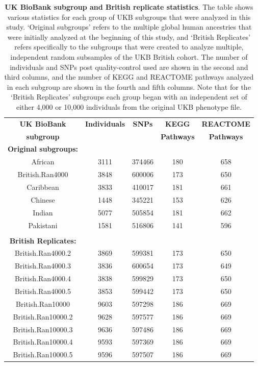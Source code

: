 \documentclass[12pt,a4paper]{article}
\begin{document}
\begin{table}[ht]
\centering
\begin{tabular}{ccccc}
  \hline
\textbf{UK BioBank} & \textbf{Individuals} & \textbf{SNPs} & \textbf{KEGG} & \textbf{REACTOME} \\
\textbf{subgroup} & & & \textbf{Pathways} & \textbf{Pathways}  \\
  \hline
\textbf{Original subgroups:} & & & & \\
African & 3111 & 374466 & 180 & 658 \\ 
British.Ran4000 & 3848 & 600006 & 173 & 650 \\ 
Caribbean & 3833 & 410017 & 181 & 661 \\ 
Chinese & 1448 & 345221 & 153 & 626 \\ 
Indian & 5077 & 505854 & 181 & 662 \\ 
Pakistani & 1581 & 516806 & 141 & 596 \\ 
\\
\textbf{British Replicates:} & & & & \\
British.Ran4000.2 & 3869 & 599381 & 173 & 650 \\ 
British.Ran4000.3 & 3836 & 600654 & 173 & 649 \\ 
British.Ran4000.4 & 3838 & 599829 & 173 & 650 \\ 
British.Ran4000.5 & 3853 & 599442 & 173 & 650 \\ 
British.Ran10000 & 9603 & 597298 & 186 & 669 \\ 
British.Ran10000.2 & 9628 & 597577 & 186 & 669 \\ 
British.Ran10000.3 & 9636 & 597486 & 186 & 669 \\ 
British.Ran10000.4 & 9593 & 597369 & 186 & 669 \\ 
British.Ran10000.5 & 9596 & 597507 & 186 & 669 \\ 
  \hline
\end{tabular}
\caption[TBD]{\textbf{UK BioBank subgroup and British replicate statistics}. The table shows various statistics for each group of UKB subgroups that were analyzed in this study. `Original subgroups' refers to the multiple global human ancestries that were initially analyzed at the beginning of this study, and `British Replicates' refers specifically to the subgroups that were created to analyze multiple, independent random subsamples of the UKB British cohort. The number of individuals and SNPs post quality-control used are shown in the second and third columns, and the number of KEGG and REACTOME pathways analyzed in each subgroup are shown in the fourth and fifth columns. Note that for the `British Replicates' subgroups each group began with an independent set of either 4,000 or 10,000 individuals from the original UKB phenotype file.}
\label{InterPath-Supp-Table-UKBPopStats}
\end{table}
\clearpage
\end{document}
